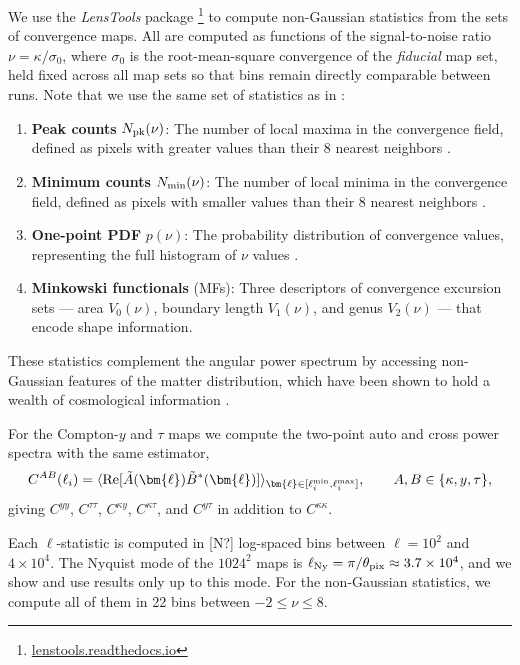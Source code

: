 \documentclass[linenumbers,trackchanges, twocolumn]{aastex701}
\begin{document}
We use the \emph{LensTools} package \citep{Petri-2016a}\footnote{\url{lenstools.readthedocs.io}} to compute non-Gaussian statistics from the sets of convergence maps. All are computed as functions of the signal-to-noise ratio $\nu = \kappa/\sigma_0$, where $\sigma_0$ is the root-mean-square convergence of the \emph{fiducial} map set, held fixed across all map sets so that bins remain directly comparable between runs. Note that we use the same set of statistics as in \citet{Lee-2026a}:
\begin{enumerate}
\item \textbf{Peak counts} $N_{\rm pk}(\nu)$: The number of local maxima in the convergence field, defined as pixels with greater values than their $8$ nearest neighbors \citep{Maturi-2010}.
\item \textbf{Minimum counts} $N_{\rm min}(\nu)$: The number of local minima in the convergence field, defined as pixels with smaller values than their $8$ nearest neighbors \citep{Coulton-2020}.
\item \textbf{One-point PDF} $p(\nu)$: The probability distribution of convergence values, representing the full histogram of $\nu$ values \citep{Thiele-2020}.
\item \textbf{Minkowski functionals} (MFs): Three descriptors of convergence excursion sets \citep{Kratochvil-2012} --- area $V_0(\nu)$, boundary length $V_1(\nu)$, and genus $V_2(\nu)$ --- that encode shape information.
\end{enumerate}
These statistics complement the angular power spectrum by accessing non-Gaussian features of the matter distribution, which have been shown to hold a wealth of cosmological information \citep{Zuercher-2021}.
 
For the Compton-$y$ and $\tau$ maps we compute the two-point auto and cross power spectra with the same estimator,
\begin{equation}\label{eq:cross_spectra}
C^{AB}(\ell_i) = \langle {\rm Re}[\tilde{A}(\bm{\ell})\tilde{B}^*(\bm{\ell})]\rangle_{\bm{\ell} \in [\ell_i^{\rm min}, \ell_i^{\rm max}]}, \qquad A, B \in \{\kappa, y, \tau\},
\end{equation}
giving $C^{yy}$, $C^{\tau\tau}$, $C^{\kappa y}$, $C^{\kappa\tau}$, and $C^{y\tau}$ in addition to $C^{\kappa\kappa}$.
 
Each $\ell$-statistic is computed in [N?] log-spaced bins between $\ell=10^2$ and $4\times10^4$. The Nyquist mode of the $1024^2$ maps is $\ell_{\rm Ny} = \pi/\theta_{\rm pix} \approx 3.7\times10^4$, and we show and use results only up to this mode. For the non-Gaussian statistics, we compute all of them in 22 bins between $-2\leq\nu\leq8$.
 
\end{document}
